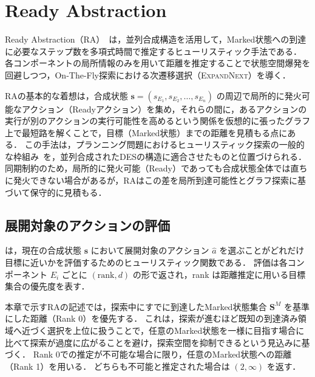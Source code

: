 \documentclass[a4paper,11pt,oneside,openany,report,dvipdfmx]{jsbook}
\newcommand\aref[1]{\hyperref[#1]{\prettyref{#1}}}
\begin{document}
\section{Ready Abstraction}

Ready Abstraction（RA）~\cite{ReadyAbstraction}は，並列合成構造を活用して，Marked状態への到達に必要なステップ数を多項式時間で推定するヒューリスティック手法である．
各コンポーネントの局所情報のみを用いて距離を推定することで状態空間爆発を回避しつつ，On-The-Fly探索における次遷移選択（\textsc{ExpandNext}）を導く．

RAの基本的な着想は，合成状態 $\bm{s} = (s_{E_1}, s_{E_2}, \ldots, s_{E_n})$ の周辺で局所的に発火可能なアクション（Readyアクション）を集め，それらの間に，あるアクションの実行が別のアクションの実行可能性を高めるという関係を仮想的に張ったグラフ上で最短路を解くことで，目標（Marked状態）までの距離を見積もる点にある．
この手法は，プランニング問題におけるヒューリスティック探索の一般的な枠組み~\cite{Heuristic}を，並列合成されたDESの構造に適合させたものと位置づけられる．
同期制約のため，局所的に発火可能（Ready）であっても合成状態全体では直ちに発火できない場合があるが，RAはこの差を局所到達可能性とグラフ探索に基づいて保守的に見積もる．

\subsection{展開対象のアクションの評価}

\aref{alg:ra_heuristic}は，現在の合成状態 $\bm{s}$ において展開対象のアクション $\hat{a}$ を選ぶことがどれだけ目標に近いかを評価するためのヒューリスティック関数である．
評価は各コンポーネント $E_i$ ごとに $(\mathrm{rank}, d)$ の形で返され，rank は距離推定に用いる目標集合の優先度を表す．

本章で示すRAの記述では，探索中にすでに到達したMarked状態集合 $\bm{S}^M$ を基準にした距離（Rank 0）を優先する．
これは，探索が進むほど既知の到達済み領域へ近づく選択を上位に扱うことで，任意のMarked状態を一様に目指す場合に比べて探索が過度に広がることを避け，探索空間を抑制できるという見込みに基づく．
Rank 0での推定が不可能な場合に限り，任意のMarked状態への距離（Rank 1）を用いる．
どちらも不可能と推定された場合は $(2,\infty)$ を返す．
\end{document}
